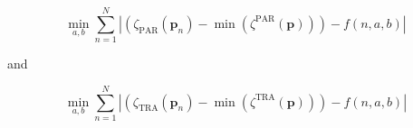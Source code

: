 \begin{equation}
	\min_{a, b} \sum_{n=1}^{N} \left|\left(\zeta_\text{PAR}(\textbf{p}_n) - \min(\zeta^\text{PAR}(\textbf{p}))\right) - f(n, a, b)\right|	
	\label{ch3:equ:find-exponential-par}
\end{equation}

and

\begin{equation}
	\min_{a, b} \sum_{n=1}^{N} \left|\left(\zeta_\text{TRA}(\textbf{p}_n) - \min(\zeta^\text{TRA}(\textbf{p}))\right) - f(n, a, b)\right|	
	\label{ch3:equ:find-exponential-tra}	
\end{equation}
